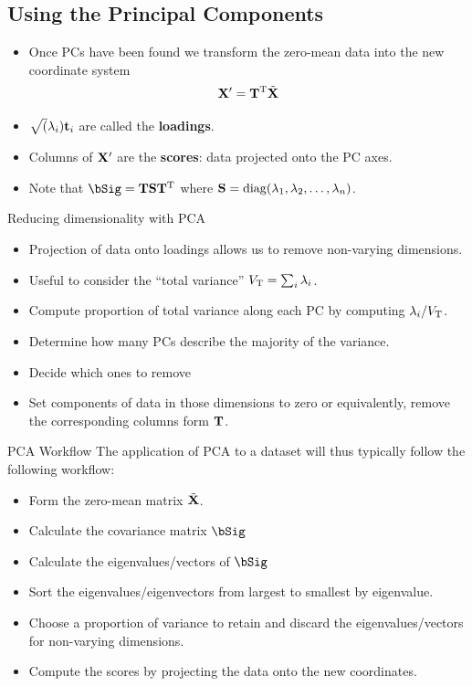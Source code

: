 \documentclass{beamer}
\begin{document}
\subsection{Using the Principal Components}
\begin{frame}{}
  \begin{itemize}
    \item Once PCs have been found we transform the zero-mean data into the new coordinate system
    \begin{equation}
      \mathbf{X}' = \mathbf{T}^{\mathrm{T}}\tilde{\mathbf{X}}
    \end{equation}
    \item $\sqrt(\lambda_i)\mathbf{t}_i$ are called the \textbf{loadings}. 
    \item Columns of $\mathbf{X}'$ are the \textbf{scores}: data projected onto the PC axes.
    \item Note that $\bSig = \bT\bS\bT^\rT$ where $\mathbf{S}=\operatorname*{diag}(\lambda_1,\lambda_2,\dots,\lambda_n)$.
  \end{itemize}
\end{frame}

\begin{frame}{Reducing dimensionality with PCA}
  \begin{itemize}
    \item Projection of data onto loadings allows us to remove non-varying dimensions.
    \item Useful to consider the ``total variance'' $V_{\mathrm{T}} = \sum_i \lambda_i$.
    \item Compute proportion of total variance along each PC by computing $\lambda_i/V_{\mathrm{T}}$. 
    \item Determine how many PCs describe the majority of the variance. 
    \item Decide which ones to remove
    \item Set components of data in those dimensions to zero or equivalently, remove the corresponding columns form $\mathbf{T}$.
  \end{itemize}
\end{frame}

\begin{frame}{PCA Workflow} 
  The application of PCA to a dataset will thus typically follow the following workflow:
  \begin{itemize}
    \item[1)] Form the zero-mean matrix $\tilde {\mathbf{X}}$.
    \item[2)] Calculate the covariance matrix $\bSig$
    \item[3)] Calculate the eigenvalues/vectors of $\bSig$
    \item[4)] Sort the eigenvalues/eigenvectors from largest to smallest by eigenvalue.
    \item[5)] Choose a proportion of variance to retain and discard the eigenvalues/vectors for non-varying dimensions.
    \item[6)] Compute the scores by projecting the data onto the new coordinates.
  \end{itemize}
\end{frame}
\end{document}
